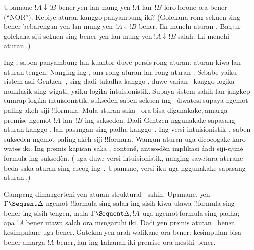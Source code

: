 \documentclass[../../../include/open-logic-section]{subfiles}
\begin{document}
\begin{prob}
Upamane $!A \downarrow !B$ bener yen lan mung yen $!A$ lan~$!B$
loro-lorone ora bener (``NOR''). Kepiye aturan  kanggo
panyambung iki? (Golekana rong sekuen sing bener bebarengan yen lan
mung yen $!A \downarrow !B$ bener. Iki menehi aturan
\RightR{\downarrow}. Banjur golekana siji sekuen sing bener yen
lan mung yen $!A \downarrow !B$ salah. Iki menehi aturan
\LeftR{\downarrow}.)
\end{prob}

Ing , saben panyambung lan kuantor duwe persis rong aturan:
aturan kiwa lan aturan tengen. Nanging ing , ana rong aturan
\LeftR{\land} lan rong aturan \RightR{\lor}. Sebabe yaiku sistem
asli Gentzen~, sing dadi tuladha kanggo , duwe
varian~ kanggo logika nonklasik sing wigati, yaiku logika
intuisionistik. Supaya sistem sahih lan jangkep tumrap logika
intuisionistik, sukseden saben sekuen ing~ diwatesi supaya
ngemot paling akeh siji !!{formula}. Mula aturan \RightR{\lor}
saka~ ora bisa digunakake, amarga premise ngemot $!A$ lan~$!B$
ing sukseden. Dadi Gentzen nggunakake sapasang aturan \RightR{\lor}
kanggo , lan pasangan sing padha kanggo~.
Ing versi intuisionistik~, saben suksedèn ngemot paling
akèh siji !!{formula}. Wangun aturan uga dicocogaké karo wates iki.
Ing premis kapisan saka \LeftR{\lif}, contoné, antesedèn implikasi
dadi siji-sijiné formula ing suksedèn.
( uga duwe versi intuisionistik, nanging sawetara aturane
beda saka aturan sing cocog ing~. Upamane, versi iku uga
nggunakake sapasang aturan \RightR{\lor}.)

Gampang dimangerteni yen aturan struktural~ sahih.
Upamane, yen $\Gamma \Sequent \Delta$ ngemot !!{formula} sing salah
ing sisih kiwa utawa !!{formula} sing bener ing sisih tengen, mula
$\Gamma \Sequent \Delta, !A$ uga ngemot formula sing padha; apa
$!A$ bener utawa salah ora mengaruhi iki. Dadi yen premis
aturan~\RightR{\Weakening} bener, kesimpulane uga bener. Gatekna
yen arah walikane ora bener: kesimpulan bisa bener amarga $!A$
bener, lan ing kahanan iki premise ora mesthi bener.
\end{document}
